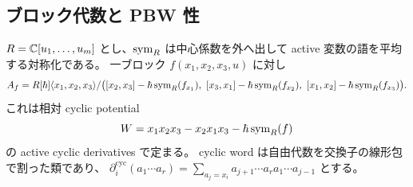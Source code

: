 \subsection{ブロック代数と PBW 性}
$R=\mathbb C[u_1,\ldots,u_m]$ とし、$\operatorname{sym}_R$ は中心係数を外へ出して active 変数の語を平均する対称化である。
一ブロック $f(x_1,x_2,x_3,u)$ に対し
\begin{equation}
A_f=R[\hbar]\langle x_1,x_2,x_3\rangle/
\bigl([x_2,x_3]-\hbar\operatorname{sym}_R(f_{x_1}),\ [x_3,x_1]-\hbar\operatorname{sym}_R(f_{x_2}),\
[x_1,x_2]-\hbar\operatorname{sym}_R(f_{x_3})\bigr).\label{eq:pg-block-algebra}
\end{equation}
これは相対 cyclic potential
\begin{equation}
W=x_1x_2x_3-x_2x_1x_3-\hbar\operatorname{sym}_R(f)\label{eq:pg-potential}
\end{equation}
の active cyclic derivatives で定まる。
cyclic word は自由代数を交換子の線形包で割った類であり、
$\partial_i^{\mathrm{cyc}}(a_1\cdots a_r)
=\sum_{a_j=x_i}a_{j+1}\cdots a_ra_1\cdots a_{j-1}$ とする。

